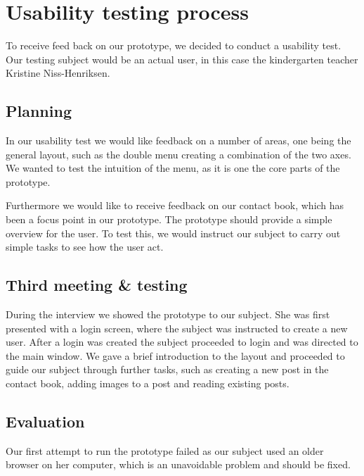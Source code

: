 \section{Usability testing process}
To receive feed back on our prototype, we decided to conduct a usability test. Our testing subject would be an actual user, in this case the kindergarten teacher Kristine Niss-Henriksen.
\subsection{Planning}

In our usability test we would like feedback on a number of areas, one being the general layout, such as the double menu creating a combination of the two axes. We wanted to test the intuition of the menu, as it is one the core parts of the prototype. 
 
Furthermore we would like to receive feedback on our contact book, which has been a focus point in our prototype. The prototype should provide a simple overview for the user. To test this, we would instruct our subject to carry out simple tasks to see how the user act.


\subsection{Third meeting \& testing}

During the interview we showed the prototype to our subject. She was first presented with a login screen, where the subject was instructed to create a new user. After a login was created the subject proceeded to login and was directed to the main window. We gave a brief introduction to the layout and proceeded to guide our subject through further tasks, such as creating a new post in the contact book, adding images to a post and reading existing posts. 


\subsection{Evaluation}
Our first attempt to run the prototype failed as our subject used an older browser on her computer, which is an unavoidable problem and should be fixed.

